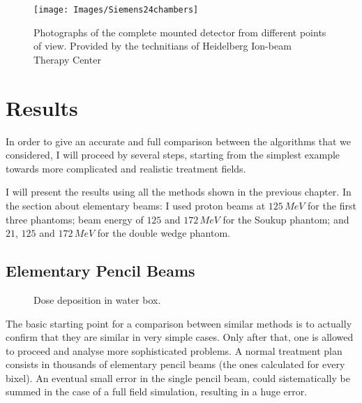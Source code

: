 \documentclass[12pt, a4paper, twoside]{book}
\begin{document}
\begin{figure}[b]
{\texttt{[image: Images/Siemens24chambers]}}
\caption{Photographs of the complete mounted detector from different points of view. Provided by the technitians of Heidelberg Ion-beam Therapy Center}
\label{fig:24cham}
\end{figure}




\chapter{Results} %
\label{chap:res}

In order to give an accurate and full comparison between the algorithms that we considered, I will proceed by several steps, starting from the simplest example towards more complicated and realistic treatment fields.

I will present the results using all the methods shown in the previous chapter. In the section about elementary beams: I used proton beams at $125\,MeV$ for the first three phantoms; beam energy of $125$ and $172\,MeV$ for the Soukup phantom; and $21$, $125$ and $172\,MeV$ for the double wedge phantom.

\section{Elementary Pencil Beams}

\begin{figure}[!b]
\centering
{}\quad
{}\quad
{}\quad
\caption{Dose deposition in water box.}
\label{fig:WB1}
\vspace{-20mm}
\end{figure}
The basic starting point for a comparison between similar methods is to actually confirm that they are similar in very simple cases. Only after that, one is allowed to proceed and analyse more sophisticated problems. 
A normal treatment plan consists in thousands of elementary pencil beams (the ones calculated for every bixel).
An eventual small error in the single pencil beam, could sistematically be summed in the case of a full field simulation, resulting in a huge error.
\end{document}
